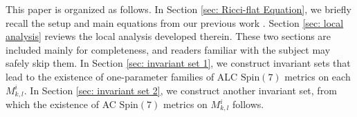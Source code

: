\documentclass[11pt,letterpaper]{amsart}
\theoremstyle{definition}
\numberwithin{equation}{section}
\newcommand{\spin}{\mathrm{Spin}}
\begin{document}
This paper is organized as follows. In Section \ref{sec: Ricci-flat Equation}, we briefly recall the setup and main equations from our previous work \cite{chi2022spin}. Section \ref{sec: local analysis} reviews the local analysis developed therein. These two sections are included mainly for completeness, and readers familiar with the subject may safely skip them. In Section \ref{sec: invariant set 1}, we construct invariant sets that lead to the existence of one-parameter families of ALC $\spin(7)$ metrics on each $M_{k,l}^i$. In Section \ref{sec: invariant set 2}, we construct another invariant set, from which the existence of AC $\spin(7)$ metrics on $M_{k,l}^i$ follows.


%
\end{document}
